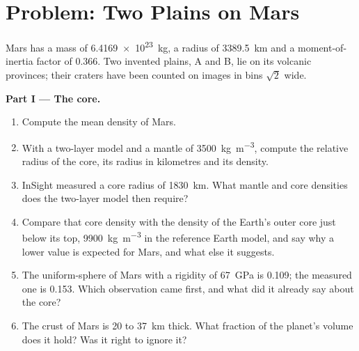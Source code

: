 \section{Problem: Two Plains on Mars}

\begin{problem}
\label{pb:b3:planetary-interiors-surfaces:1}
Mars has a mass of \qty{6.4169e23}{kg}, a radius of \qty{3389.5}{km} and a
moment-of-inertia factor of 0.366. Two invented plains, A and B, lie on its
volcanic provinces; their craters have been counted on images in bins
$\sqrt2$ wide.

\medskip\noindent\textbf{Part I --- The core.}
\begin{enumerate}
\item Compute the mean density of Mars.
\item With a two-layer model and a mantle of \qty{3500}{kg.m^{-3}}, compute
  the relative radius of the core, its radius in kilometres and its
  density.
\item InSight measured a core radius of \qty{1830}{km}. What mantle and core
  densities does the two-layer model then require?
\item Compare that core density with the density of the Earth's outer core
  just below its top, \qty{9900}{kg.m^{-3}} in the reference Earth model,
  and say why a lower value is expected for Mars, and what else it
  suggests.
\item The uniform-sphere  of Mars with a rigidity of
  \qty{67}{GPa} is 0.109; the measured one is 0.153. Which observation came
  first, and what did it already say about the core?
\item The crust of Mars is 20 to \qty{37}{km} thick. What fraction of the
  planet's volume does it hold? Was it right to ignore it?
\end{enumerate}


\end{problem}
